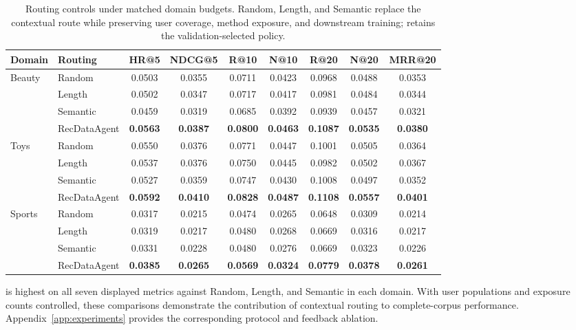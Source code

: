 \begin{table}[htbp]
\centering
\caption{Routing controls under matched domain budgets. Random, Length, and Semantic replace the contextual route while preserving user coverage, method exposure, and downstream training; \method{} retains the validation-selected policy.}
\label{tab:routing}
\small
\begin{tabular}{llccccccc}
\hline
Domain & Routing & HR@5 & NDCG@5 & R@10 & N@10 & R@20 & N@20 & MRR@20 \\
\hline
\multirow[c]{4}{*}{Beauty} & Random   & 0.0503 & 0.0355 & 0.0711 & 0.0423 & 0.0968 & 0.0488 & 0.0353 \\
& Length   & 0.0502 & 0.0347 & 0.0717 & 0.0417 & 0.0981 & 0.0484 & 0.0344 \\
& Semantic & 0.0459 & 0.0319 & 0.0685 & 0.0392 & 0.0939 & 0.0457 & 0.0321 \\
\rowcolor{methodblue}& RecDataAgent &\textbf{0.0563}&\textbf{0.0387}&\textbf{0.0800}&\textbf{0.0463}&\textbf{0.1087}&\textbf{0.0535}&\textbf{0.0380}\\
\hline
 \multirow[c]{4}{*}{Toys} & Random   & 0.0550 & 0.0376 & 0.0771 & 0.0447 & 0.1001 & 0.0505 & 0.0364 \\
& Length   & 0.0537 & 0.0376 & 0.0750 & 0.0445 & 0.0982 & 0.0502 & 0.0367 \\
& Semantic & 0.0527 & 0.0359 & 0.0747 & 0.0430 & 0.1008 & 0.0497 & 0.0352 \\
\rowcolor{methodblue}& RecDataAgent &\textbf{0.0592}&\textbf{0.0410}&\textbf{0.0828}&\textbf{0.0487}&\textbf{0.1108}&\textbf{0.0557}&\textbf{0.0401}\\
\hline
 \multirow[c]{4}{*}{Sports} & Random   & 0.0317 & 0.0215 & 0.0474 & 0.0265 & 0.0648 & 0.0309 & 0.0214 \\
& Length   & 0.0319 & 0.0217 & 0.0480 & 0.0268 & 0.0669 & 0.0316 & 0.0217 \\
& Semantic & 0.0331 & 0.0228 & 0.0480 & 0.0276 & 0.0669 & 0.0323 & 0.0226 \\
\rowcolor{methodblue}& RecDataAgent &\textbf{0.0385}&\textbf{0.0265}&\textbf{0.0569}&\textbf{0.0324}&\textbf{0.0779}&\textbf{0.0378}&\textbf{0.0261}\\
\hline
\end{tabular}
\end{table}

\method{} is highest on all seven displayed metrics against Random, Length, and Semantic in each domain. With user populations and exposure counts controlled, these comparisons demonstrate the contribution of contextual routing to complete-corpus performance. Appendix~\ref{app:experiments} provides the corresponding protocol and feedback ablation.

